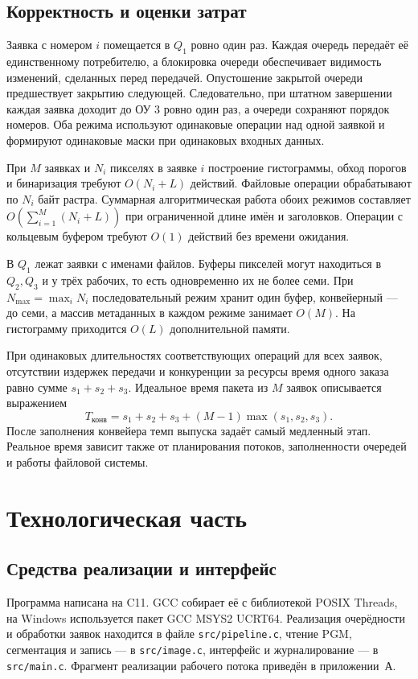 \clearpage\subsection{Корректность и оценки затрат}
Заявка с номером \(i\) помещается в \(Q_1\) ровно один раз. Каждая очередь передаёт её единственному потребителю, а блокировка очереди обеспечивает видимость изменений, сделанных перед передачей. Опустошение закрытой очереди предшествует закрытию следующей. Следовательно, при штатном завершении каждая заявка доходит до ОУ 3 ровно один раз, а очереди сохраняют порядок номеров. Оба режима используют одинаковые операции над одной заявкой и формируют одинаковые маски при одинаковых входных данных.

При \(M\) заявках и \(N_i\) пикселях в заявке \(i\) построение гистограммы, обход порогов и бинаризация требуют \(O(N_i+L)\) действий. Файловые операции обрабатывают по \(N_i\) байт растра. Суммарная алгоритмическая работа обоих режимов составляет \(O(\sum_{i=1}^{M}(N_i+L))\) при ограниченной длине имён и заголовков. Операции с кольцевым буфером требуют \(O(1)\) действий без времени ожидания.

В \(Q_1\) лежат заявки с именами файлов. Буферы пикселей могут находиться в \(Q_2,Q_3\) и у трёх рабочих, то есть одновременно их не более семи. При \(N_{\max}=\max_i N_i\) последовательный режим хранит один буфер, конвейерный --- до семи, а массив метаданных в каждом режиме занимает \(O(M)\). На гистограмму приходится \(O(L)\) дополнительной памяти.

При одинаковых длительностях соответствующих операций для всех заявок, отсутствии издержек передачи и конкуренции за ресурсы время одного заказа равно сумме \(s_1+s_2+s_3\). Идеальное время пакета из \(M\) заявок описывается выражением
\begin{equation}
  T_{\text{конв}}=s_1+s_2+s_3+(M-1)\max(s_1,s_2,s_3).
\end{equation}
После заполнения конвейера темп выпуска задаёт самый медленный этап. Реальное время зависит также от планирования потоков, заполненности очередей и работы файловой системы.

\clearpage\section{Технологическая часть}
\subsection{Средства реализации и интерфейс}
Программа написана на C11. GCC собирает её с библиотекой POSIX Threads, на Windows используется пакет GCC MSYS2 UCRT64. Реализация очерёдности и обработки заявок находится в файле \texttt{src/pipeline.c}, чтение PGM, сегментация и запись --- в \texttt{src/image.c}, интерфейс и журналирование --- в \texttt{src/main.c}. Фрагмент реализации рабочего потока приведён в приложении~А.

